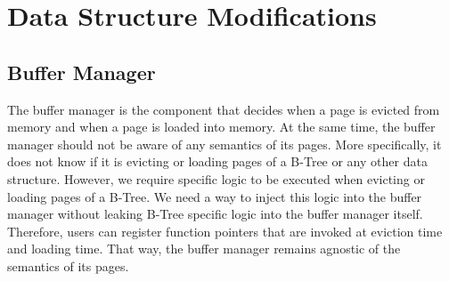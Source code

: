 
\section{Data Structure Modifications}
\subsection*{Buffer Manager}
The buffer manager is the component that decides when a page is evicted from memory and when a page is loaded into memory.
At the same time, the buffer manager should not be aware of any semantics of its pages.
More specifically, it does not know if it is evicting or loading pages of a B-Tree or any other data structure.
However, we require specific logic to be executed when evicting or loading pages of a B-Tree.
We need a way to inject this logic into the buffer manager without leaking B-Tree specific logic into the buffer manager itself.
Therefore, users can register function pointers that are invoked at eviction time and loading time.
That way, the buffer manager remains agnostic of the semantics of its pages.

